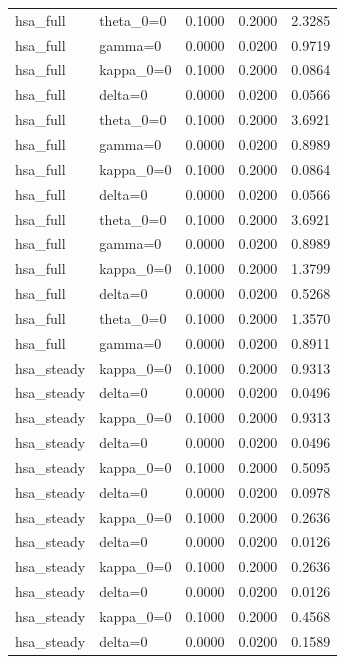 \begin{tabular}{llrrr}
hsa\_full & theta\_0=0 & 0.1000 & 0.2000 & 2.3285 \\
hsa\_full & gamma=0 & 0.0000 & 0.0200 & 0.9719 \\
hsa\_full & kappa\_0=0 & 0.1000 & 0.2000 & 0.0864 \\
hsa\_full & delta=0 & 0.0000 & 0.0200 & 0.0566 \\
hsa\_full & theta\_0=0 & 0.1000 & 0.2000 & 3.6921 \\
hsa\_full & gamma=0 & 0.0000 & 0.0200 & 0.8989 \\
hsa\_full & kappa\_0=0 & 0.1000 & 0.2000 & 0.0864 \\
hsa\_full & delta=0 & 0.0000 & 0.0200 & 0.0566 \\
hsa\_full & theta\_0=0 & 0.1000 & 0.2000 & 3.6921 \\
hsa\_full & gamma=0 & 0.0000 & 0.0200 & 0.8989 \\
hsa\_full & kappa\_0=0 & 0.1000 & 0.2000 & 1.3799 \\
hsa\_full & delta=0 & 0.0000 & 0.0200 & 0.5268 \\
hsa\_full & theta\_0=0 & 0.1000 & 0.2000 & 1.3570 \\
hsa\_full & gamma=0 & 0.0000 & 0.0200 & 0.8911 \\
hsa\_steady & kappa\_0=0 & 0.1000 & 0.2000 & 0.9313 \\
hsa\_steady & delta=0 & 0.0000 & 0.0200 & 0.0496 \\
hsa\_steady & kappa\_0=0 & 0.1000 & 0.2000 & 0.9313 \\
hsa\_steady & delta=0 & 0.0000 & 0.0200 & 0.0496 \\
hsa\_steady & kappa\_0=0 & 0.1000 & 0.2000 & 0.5095 \\
hsa\_steady & delta=0 & 0.0000 & 0.0200 & 0.0978 \\
hsa\_steady & kappa\_0=0 & 0.1000 & 0.2000 & 0.2636 \\
hsa\_steady & delta=0 & 0.0000 & 0.0200 & 0.0126 \\
hsa\_steady & kappa\_0=0 & 0.1000 & 0.2000 & 0.2636 \\
hsa\_steady & delta=0 & 0.0000 & 0.0200 & 0.0126 \\
hsa\_steady & kappa\_0=0 & 0.1000 & 0.2000 & 0.4568 \\
hsa\_steady & delta=0 & 0.0000 & 0.0200 & 0.1589 \\
\bottomrule
\end{tabular}
